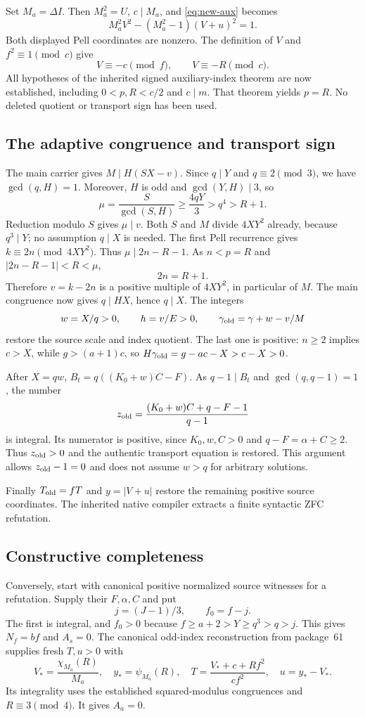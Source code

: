 Set $M_a=\Delta I$.  Then $M_a^2=U$, $c\mid M_a$, and
\eqref{eq:new-aux} becomes
\[
 M_a^2V^2-(M_a^2-1)(V+u)^2=1.
\]
Both displayed Pell coordinates are nonzero.  The definition of $V$ and
$f^2\equiv1\pmod c$ give
\[
 V\equiv-c\pmod f,\qquad V\equiv-R\pmod c.
\]
All hypotheses of the inherited signed auxiliary-index theorem are now
established, including $0<p,R<c/2$ and $c\mid m$.  That theorem yields
$p=R$.  No deleted quotient or transport sign has been used.

\subsection{The adaptive congruence and transport sign}

The main carrier gives $M\mid H(SX-v)$.  Since $q\mid Y$ and
$q\equiv2\pmod3$, we have $\gcd(q,H)=1$.  Moreover, $H$ is odd and
$\gcd(Y,H)\mid3$, so
\[
 \mu=\frac{S}{\gcd(S,H)}\ge\frac{4qY}{3}>q^4>R+1.
\]
Reduction modulo $S$ gives $\mu\mid v$.  Both $S$ and $M$ divide
$4XY^2$ already, because $q^3\mid Y$; no assumption $q\mid X$ is needed.
The first Pell recurrence gives $k\equiv2n\pmod{4XY^2}$.  Thus
$\mu\mid2n-R-1$.  As $n<p=R$ and $|2n-R-1|<R<\mu$,
\[
 2n=R+1.
\]
Therefore $v=k-2n$ is a positive multiple of $4XY^2$, in particular of
$M$.  The main congruence now gives $q\mid HX$, hence $q\mid X$.
The integers
\[
 w=X/q>0,\qquad h=v/E>0,\qquad
 \gamma_{\rm old}=\gamma+w-v/M
\]
restore the source scale and index quotient.  The last one is positive:
$n\ge2$ implies $c>X$, while $g>(a+1)c$, so
$H\gamma_{\rm old}=g-ac-X>c-X>0$.

After $X=qw$, $B_t=q((K_0+w)C-F)$.  As $q-1\mid B_t$ and
$\gcd(q,q-1)=1$, the number
\[
 z_{\rm old}=\frac{(K_0+w)C+q-F-1}{q-1}
\]
is integral.  Its numerator is positive, since $K_0,w,C>0$ and
$q-F=\alpha+C\ge2$.  Thus $z_{\rm old}>0$ and the authentic transport
equation is restored.  This argument allows $z_{\rm old}-1=0$ and does
not assume $w>q$ for arbitrary solutions.

Finally $T_{\rm old}=fT$ and $y=|V+u|$ restore the remaining positive
source coordinates.  The inherited native compiler extracts a finite
syntactic ZFC refutation.

\subsection{Constructive completeness}

Conversely, start with canonical positive normalized source witnesses for
a refutation.  Supply their $F,\alpha,C$ and put
\[
 j=(J-1)/3,\qquad f_0=f-j.
\]
The first is integral, and $f_0>0$ because
$f\ge a+2>Y\ge q^3>q>j$.  This gives $N_f=bf$ and $A_s=0$.
The canonical odd-index reconstruction from package~61 supplies fresh
$T,u>0$ with
\[
 V_* =\frac{\chi_{M_a}(R)}{M_a},\quad y_* =\psi_{M_a}(R),\quad
 T=\frac{V_*+c+Rf^2}{cf^2},\quad u=y_*-V_*.
\]
Its integrality uses the established squared-modulus congruences and
$R\equiv3\pmod4$.  It gives $A_a=0$.

